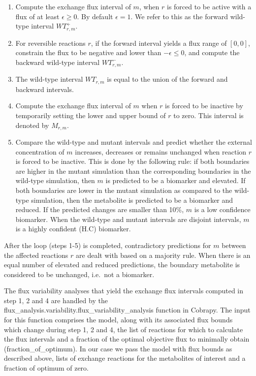 \documentclass[10pt,a4paper,onecolumn]{article}
\newcommand{\tightlist}{%
  \setlength{\itemsep}{1pt}\setlength{\parskip}{0pt}\setlength{\parsep}{0pt}}
\begin{document}
\begin{enumerate}
\def\labelenumi{\arabic{enumi}.}
\tightlist
\item
  Compute the exchange flux interval of \(m\), when \(r\) is forced to
  be active with a flux of at least \(\epsilon \geq 0\). By default
  \(\epsilon = 1\). We refer to this as the forward wild-type interval
  \(WT_{r,m}^+\).
\item
  For reversible reactions \(r\), if the forward interval yields a flux
  range of \([0,0]\), constrain the flux to be negative and lower than
  \(-\epsilon \leq 0\), and compute the backward wild-type interval
  \(WT_{r,m}^-\).
\item
  The wild-type interval \(WT_{r,m}\) is equal to the union of the
  forward and backward intervals.
\item
  Compute the exchange flux interval of \(m\) when \(r\) is forced to be
  inactive by temporarily setting the lower and upper bound of \(r\) to
  zero. This interval is denoted by \(M_{r,m}\).
\item
  Compare the wild-type and mutant intervals and predict whether the
  external concentration of \(m\) increases, decreases or remains
  unchanged when reaction \(r\) is forced to be inactive. This is done
  by the following rule: if both boundaries are higher in the mutant
  simulation than the corresponding boundaries in the wild-type
  simulation, then \(m\) is predicted to be a biomarker and elevated. If
  both boundaries are lower in the mutant simulation as compared to the
  wild-type simulation, then the metabolite is predicted to be a
  biomarker and reduced. If the predicted changes are smaller than 10\%,
  \(m\) is a low confidence biomarker. When the wild-type and mutant
  intervals are disjoint intervals, \(m\) is a highly confident (H.C)
  biomarker.
\end{enumerate}

After the loop (steps 1-5) is completed, contradictory predictions for
\(m\) between the affected reactions \(r\) are dealt with based on a
majority rule. When there is an equal number of elevated and reduced
predictions, the boundary metabolite is considered to be unchanged,
i.e.~not a biomarker.

The flux variability analyses that yield the exchange flux intervals
computed in step 1, 2 and 4 are handled by the
flux\_analysis.variability.flux\_variability\_analysis function in
Cobrapy. The input for this function comprises the model, along with its
associated flux bounds which change during step 1, 2 and 4, the list of
reactions for which to calculate the flux intervals and a fraction of
the optimal objective flux to minimally obtain (fraction\_of\_optimum).
In our case we pass the model with flux bounds as described above, lists
of exchange reactions for the metabolites of interest and a fraction of
optimum of zero.
\end{document}
